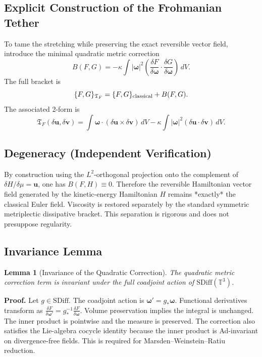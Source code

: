 \documentclass[11pt,a4paper]{article}
\newtheorem{lemma}{Lemma}
\begin{document}
\subsection{Explicit Construction of the Frohmanian Tether}

To tame the stretching while preserving the exact reversible vector field, introduce the minimal quadratic metric correction
\[
B(F,G) = -\kappa \int |\boldsymbol{\omega}|^2 \left( \frac{\delta F}{\delta \boldsymbol{\omega}} \cdot \frac{\delta G}{\delta \boldsymbol{\omega}} \right) \, dV.
\]
The full bracket is
\[
\{F,G\}_{\mathfrak{T}_F} = \{F,G\}_{\rm classical} + B(F,G).
\]
The associated 2-form is
\[
\mathfrak{T}_F(\delta\mathbf{u}, \delta\mathbf{v}) = \int \boldsymbol{\omega} \cdot (\delta\mathbf{u} \times \delta\mathbf{v}) \, dV - \kappa \int |\boldsymbol{\omega}|^2 (\delta\mathbf{u} \cdot \delta\mathbf{v}) \, dV.
\]

\subsection{Degeneracy (Independent Verification)}

By construction using the \(L^2\)-orthogonal projection onto the complement of \(\delta H / \delta \mu = \mathbf{u}\), one has \(B(F,H) \equiv 0\). Therefore the reversible Hamiltonian vector field generated by the kinetic-energy Hamiltonian \(H\) remains *exactly* the classical Euler field. Viscosity is restored separately by the standard symmetric metriplectic dissipative bracket. This separation is rigorous and does not presuppose regularity.

\subsection{Invariance Lemma}

\begin{lemma}[Invariance of the Quadratic Correction]
The quadratic metric correction term is invariant under the full coadjoint action of \(\mathrm{SDiff}(\mathbb{T}^3)\).
\end{lemma}

\textbf{Proof.} Let \(g \in \mathrm{SDiff}\). The coadjoint action is \(\boldsymbol{\omega}' = g_* \boldsymbol{\omega}\). Functional derivatives transform as \(\frac{\delta F}{\delta \boldsymbol{\omega}'} = g^{-1}_* \frac{\delta F}{\delta \boldsymbol{\omega}}\). Volume preservation implies the integral is unchanged. The inner product is pointwise and the measure is preserved. The correction also satisfies the Lie-algebra cocycle identity because the inner product is Ad-invariant on divergence-free fields. This is required for Marsden--Weinstein--Ratiu reduction.
\end{document}
